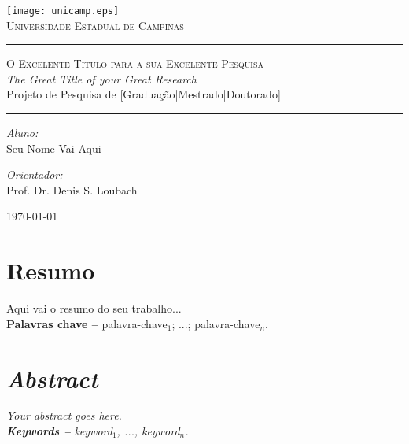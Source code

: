 \documentclass[12pt,a4paper]{article}
\newcommand{\titulo}{O Excelente Título para a sua Excelente Pesquisa}
\newcommand{\tituloI}{The Great Title of your Great Research}
\newcommand{\subtitulo}{Projeto de Pesquisa de [Graduação|Mestrado|Doutorado]}
\newcommand{\aluno}{Seu Nome Vai Aqui}
\newcommand{\orientador}{Denis S. Loubach}
\begin{document}
\begin{titlepage}
	\begin{center}
		
		\texttt{[image: unicamp.eps]}\\[1cm]
		\textsc{\LARGE Universidade Estadual de Campinas}\\[1cm]
		
		\hrule
		\vspace{0.5cm}
		\textsc{\Large \titulo}\\[0.25cm]
      \textit{\tituloI}\\[0.5cm]
		{\large \subtitulo}\\[0.5cm]
		\hrule
		\vspace{2cm}
		\begin{minipage}{0.4\textwidth}
		    \begin{flushleft} \large
			    \emph{Aluno:}\\
			    \aluno
			 \end{flushleft}
	    \end{minipage}
	    \begin{minipage}{0.4\textwidth}
		    \begin{flushright} \large
			    \emph{Orientador:} \\
			    Prof. Dr. \orientador
		    \end{flushright}
		\end{minipage}
		\vfill
		{\large \today}
	\end{center}
\end{titlepage}
    
\tableofcontents

\newpage

\section*{Resumo}
\label{sec:resumo}
Aqui vai o resumo do seu trabalho...\\%

\textbf{Palavras chave --} palavra-chave$_1$; ...; palavra-chave$_n$.


\newpage
\section*{\textit{Abstract}}
\label{sec:abstract}
\textit{
  Your abstract goes here.
}\\%

\textit{\textbf{Keywords --} keyword$_1$, ..., keyword$_n$.}
\end{document}
